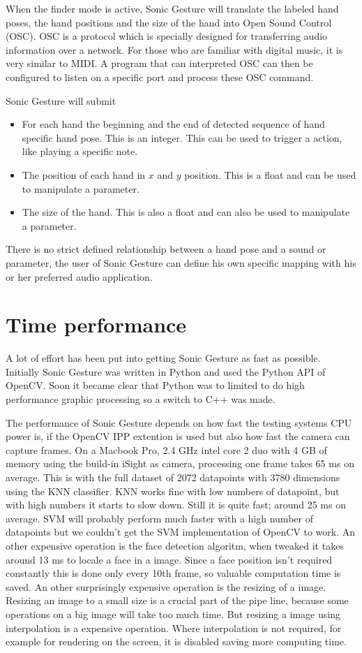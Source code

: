 When the finder mode is active, Sonic Gesture will translate the labeled hand poses, the hand positions and the size of the hand into Open Sound Control (OSC). OSC is a protocol which is specially designed for transferring audio information over a network. For those who are familiar with digital music, it is very similar to MIDI. A program that can interpreted OSC can then be configured to listen on a specific port and process these OSC command.

Sonic Gesture will submit
\begin{itemize}
	\item For each hand the beginning and the end of detected sequence of hand specific hand pose. This is an integer. This can be used to trigger a action, like playing a specific note.
	\item The position of each hand in $x$ and $y$ position. This is a float and can be used to manipulate a parameter.
	\item The size of the hand. This is also a float and can also be used to manipulate a parameter.
\end{itemize}

There is no strict defined relationship between a hand pose and a sound or parameter, the user of Sonic Gesture can define his own specific mapping with his or her preferred audio application. 

\section{Time performance}
A lot of effort has been put into getting Sonic Gesture as fast as possible. Initially Sonic Gesture was written in Python and used the Python API of OpenCV. Soon it became clear that Python was to limited to do high performance graphic processing so a switch to C++ was made. 

The performance of Sonic Gesture depends on how fast the testing systems CPU power is, if the OpenCV IPP extention is used but also how fast the camera can capture frames. On a Macbook Pro, 2.4 GHz intel core 2 duo with 4 GB of memory using the build-in iSight as camera, processing one frame takes 65 ms on average. This is with the full dataset of 2072 datapoints with 3780 dimensions using the KNN classifier. KNN works fine with low numbers of datapoint, but with high numbers it starts to slow down. Still it is quite fast; around 25 ms on average. SVM will probably perform much faster with a high number of datapoints but we couldn't get the SVM implementation of OpenCV to work. An other expensive operation is the face detection algoritm, when tweaked it takes around 13 ms to locale a face in a image. Since a face position isn't required constantly this is done only every 10th frame, so valuable computation time is saved. An other surprisingly expensive operation is the resizing of a image. Resizing an image to a small size is a crucial part of the pipe line, because some operations on a big image will take too much time. But resizing a image using interpolation is a expensive operation. Where interpolation is not required, for example for rendering on the screen, it is disabled saving more computing time. 



